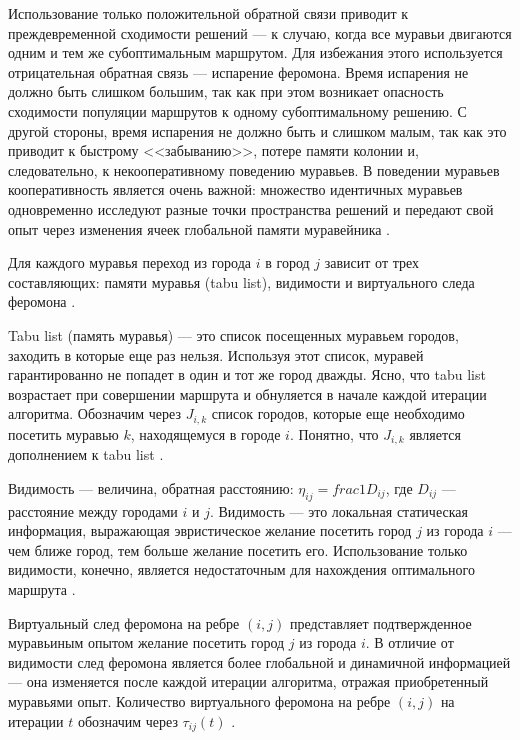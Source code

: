 Использование только положительной обратной связи приводит к преждевременной сходимости решений --- к случаю, когда все муравьи двигаются одним и тем же субоптимальным маршрутом. 
Для избежания этого используется отрицательная обратная связь --- испарение феромона. 
Время испарения не должно быть слишком большим, так как при этом возникает опасность сходимости популяции маршрутов к одному субоптимальному решению. 
С другой стороны, время испарения не должно быть и слишком малым, так как это приводит к быстрому <<забыванию>>, потере памяти колонии и, следовательно, к некооперативному поведению муравьев. 
В поведении муравьев кооперативность является очень важной: множество идентичных муравьев одновременно исследуют разные точки пространства решений и передают свой опыт через изменения ячеек глобальной памяти муравейника \cite{Shtovba2003}.

Для каждого муравья переход из города $i$ в город $j$ зависит от трех составляющих: памяти муравья (tabu list), видимости и виртуального следа феромона \cite{Shtovba2003}.

Tabu list (память муравья) --- это список посещенных муравьем городов, заходить в которые еще раз нельзя.  
Используя этот список, муравей гарантированно не попадет в один и тот же город дважды. 
Ясно, что tabu list возрастает при совершении маршрута и обнуляется в начале каждой итерации алгоритма.  
Обозначим через $J_{i,k}$ список городов, которые еще необходимо посетить муравью $k$, находящемуся в городе $i$. 
Понятно, что $J_{i,k}$ является дополнением к tabu list \cite{Shtovba2003}.

Видимость --- величина, обратная расстоянию: $\eta_{ij} = frac{1}{D_{ij}}$, где $D_{ij}$ --- расстояние между городами $i$ и $j$. 
Видимость --- это локальная статическая информация, выражающая эвристическое желание посетить город $j$ из города $i$ --- чем ближе город, тем больше желание посетить его. 
Использование только видимости, конечно, является недостаточным для нахождения оптимального маршрута \cite{Shtovba2003}.

Виртуальный след феромона на ребре $(i, j)$ представляет подтвержденное муравьиным опытом желание посетить город $j$ из города $i$. 
В отличие от видимости след феромона является более глобальной и динамичной информацией --- она изменяется после каждой итерации алгоритма, отражая приобретенный муравьями опыт. 
Количество виртуального феромона на ребре $(i, j)$ на итерации $t$ обозначим через $\tau_{ij}(t)$ \cite{Shtovba2003}.

